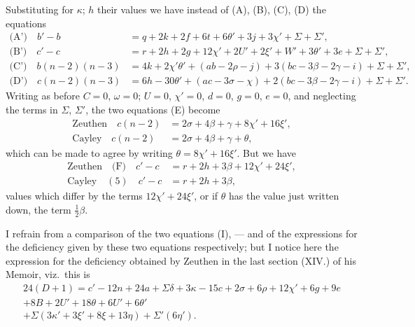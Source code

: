 \documentclass[11pt,a4paper]{article}
\theoremstyle{plain}
\theoremstyle{definition}
\theoremstyle{remark}
\begin{document}
\newpage
\setcounter{page}{628}

Substituting for $\kappa$; $h$ their values we have instead of (A), (B), (C), (D) the equations
\begin{align*}
\text{(A')}\quad b'-b &= q+2k+2f+6t+6\theta'+3j+3\chi'+\Sigma+\Sigma',\\
\text{(B')}\quad c'-c &= r+2h+2g+12\chi'+2U'+2\xi'+W'+3\theta'+3e+\Sigma+\Sigma',\\
\text{(C')}\quad b(n-2)(n-3) &= 4k+2\chi'\theta'+(ab-2\rho-j)+3(bc-3\beta-2\gamma-i)+\Sigma+\Sigma',\\
\text{(D')}\quad c(n-2)(n-3) &= 6h-30\theta'+(ac-3\sigma-\chi)+2(bc-3\beta-2\gamma-i)+\Sigma+\Sigma'.
\end{align*}
Writing as before $C=0$, $\omega=0$; $U=0$, $\chi'=0$, $d=0$, $g=0$, $e=0$, and neglecting the terms in $\Sigma$, $\Sigma'$, the two equations (E) become
\begin{align*}
\text{Zeuthen}\quad c(n-2) &= 2\sigma+4\beta+\gamma+8\chi'+16\xi',\\
\text{Cayley}\quad c(n-2) &= 2\sigma+4\beta+\gamma+\theta,
\end{align*}
which can be made to agree by writing $\theta=8\chi'+16\xi'$. But we have
\begin{align*}
\text{Zeuthen}\quad \text{(F)}\quad c'-c &= r+2h+3\beta+12\chi'+24\xi',\\
\text{Cayley}\quad (5)\quad c'-c &= r+2h+3\beta,
\end{align*}
values which differ by the terms $12\chi'+24\xi'$, or if $\theta$ has the value just written down, the term $\tfrac{1}{2}\beta$.

I refrain from a comparison of the two equations (I), --- and of the expressions for the deficiency given by these two equations respectively; but I notice here the expression for the deficiency obtained by Zeuthen in the last section (XIV.) of his Memoir, viz.\ this is
\begin{multline*}
24(D+1)=c'-12n+24a+\Sigma\delta+3\kappa-15c+2\sigma+6\rho+12\chi'+6g+9e\\
+8B+2U'+18\theta+6U'+6\theta'\\
+\Sigma(3\kappa'+3\xi'+8\xi+13\eta)+\Sigma'(6\eta').
\end{multline*}
\end{document}
